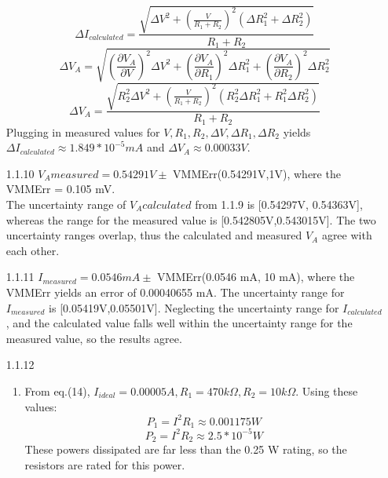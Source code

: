 \documentclass{article}
\begin{document}
\begin{itemize}
\begin{equation}
    \end{equation}
    \begin{equation}
        \Delta I_{calculated} = \frac{\sqrt{\Delta V ^{2} + (\frac{V}{R_1 + R_2})^{2}(\Delta R_1^{2} + \Delta R_2 ^{2})}}{R_1 + R_2}
    \end{equation}
    \begin{equation}
        \Delta V_A = \sqrt{(\frac{\partial V_A}{\partial V})^{2}\Delta V^{2}+(\frac{\partial V_A}{\partial R_1})^{2}\Delta R_1^{2}+(\frac{\partial V_A}{\partial R_2})^{2}\Delta R_2^{2}}
    \end{equation}
    \begin{equation}
        \Delta V_A = \frac{\sqrt{R_2^{2}\Delta V ^{2} + (\frac{V}{R_1 + R_2})^{2}(R_2^{2}\Delta R_1^{2} + R_1^{2}\Delta R_2 ^{2})}}{R_1 + R_2}
    \end{equation}
    Plugging in measured values for $V,R_1,R_2,\Delta V,\Delta R_1,\Delta R_2$ yields $\Delta I_{calculated} \approx 1.849*10^{-5} mA$ and $\Delta V_A \approx 0.00033 V$.
    \item[1.1.10] $V_A measured = 0.54291 V \pm $ VMMErr(0.54291V,1V), where the VMMErr = 0.105 mV.\\
    The uncertainty range of $V_A calculated$ from 1.1.9 is [0.54297V, 0.54363V], whereas the range for the measured value is [0.542805V,0.543015V]. The two uncertainty ranges overlap, thus the calculated and measured $V_A$ agree with each other.
    \item[1.1.11] $I_{measured} = 0.0546 mA \pm$ VMMErr(0.0546 mA, 10 mA), where the VMMErr yields an error of 0.00040655 mA. The uncertainty range for $I_{measured}$ is [0.05419V,0.05501V]. Neglecting the uncertainty range for $I_{calculated}$, and the calculated value falls well within the uncertainty range for the measured value, so the results agree.
    \item[1.1.12] 
    \begin{enumerate}[label=\alph*]
        \item From eq.(14), $I_{ideal} = 0.00005 A, R_1 = 470k\Omega,R_2 = 10k\Omega$. Using these values:
        \begin{equation}
            P_1 = I^{2}R_1 \approx 0.001175 W
        \end{equation}
        \begin{equation}
            P_2 = I^{2}R_2 \approx 2.5 * 10^{-5} W
        \end{equation}
        These powers dissipated are far less than the 0.25 W rating, so the resistors are rated for this power. 

\end{enumerate}
\end{itemize}
\end{document}
